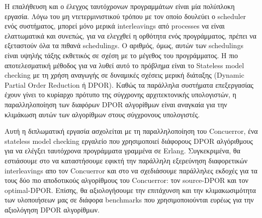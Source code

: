 Η επαλήθευση και ο έλεγχος ταυτόχρονων προγραμμάτων είναι μία πολύπλοκη εργασία. Λόγω του μη ντετερμινιστικού τρόπου με τον οποίο
δουλεύει ο scheduler ενός συστήματος, μπορεί μόνο μερικά interleavings από processes να είναι ελαττωματικά και συνεπώς, 
για να ελεγχθεί η ορθότητα ενός προγράμματος, πρέπει να εξεταστούν όλα τα πιθανά schedulings. Ο αριθμός, όμως, αυτών των 
schedulings είναι υψηλής τάξης εκθετικός σε σχέση με το μέγεθος του προγράμματος. Η πιο αποτελεσματική μέθοδος για να λυθεί αυτό
το πρόβλημα είναι το Stateless model checking με τη χρήση αναγωγής σε δυναμικές
σχέσεις μερική διάταξης (Dynamic Partial Order Reduction ή DPOR). Καθώς τα παράλληλα συστήματα επεξεργασίας έχουν
γίνει το κυρίαρχο πρότυπο της σύγχρονης αρχιτεκτονικής υπολογιστών, η παραλληλοποίηση των διαφόρων DPOR αλγορίθμων είναι 
αναγκαία για την κλιμάκωση αυτών των αλγορίθμων στους σύγχρονους υπολογιστές.

Αυτή η διπλωματική εργασία ασχολείται με τη παραλληλοποίηση του Concuerror, ένα stateless model checking εργαλείο που χρησιμοποιεί
διάφορους DPOR αλγόριθμους για να ελέγξει ταυτόχρονα προγράμματα γραμμένα σε Erlang. Συγκεκριμένα, θα εστιάσουμε στο
να καταστήσουμε εφικτή την παράλληλη εξερεύνηση διαφορετικών interleavings απο τον Concuerror και στο να σχεδιάσουμε 
παράλληλες εκδοχές για τα τους δύο πιο αποδοτικούς αλγορίθμους του Concuerror: τον source-DPOR και τον optimal-DPOR.
Επίσης, θα αξιολογήσουμε την επιτάχυνση και την κλιμακωσιμότητα των υλοποιήσεων μας σε διάφορα benchmarks που 
χρησιμοποιούνται ευρέως για την αξιολόγηση DPOR αλγορίθμων. 

